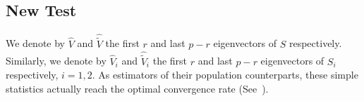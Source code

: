 \documentclass[review]{elsarticle}
\theoremstyle{plain}
\theoremstyle{definition}
\newtheorem{remark}{\quad\quad Remark}
\theoremstyle{remark}
\begin{document}



\subsection{New Test}
We denote by $\hat{V}$ and $\hat{\tilde{V}}$ the first $r$ and last $p-r$ eigenvectors of $S$ respectively.
Similarly, we denote by  $\hat{V}_i$ and $\hat{\tilde{V}}_i$ the first $r$ and last $p-r$ eigenvectors of $S_i$ respectively, $i=1,2$.
 As estimators of their population counterparts, these simple statistics actually reach the optimal convergence rate (See~\cite{Cai2012Sparse}).
\end{document}
